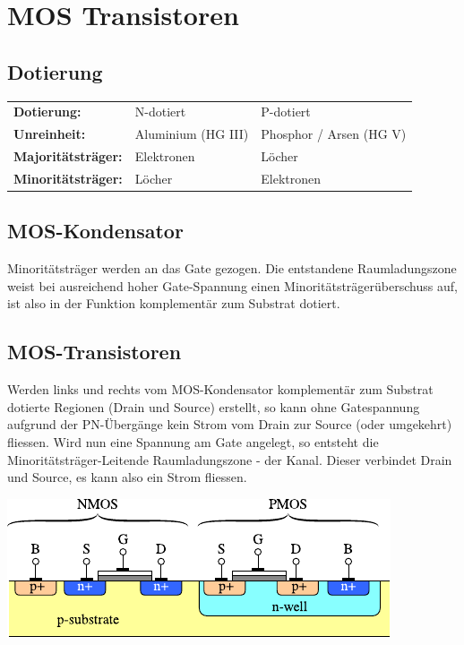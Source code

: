\section{MOS Transistoren}

\subsection{Dotierung}
\begin{center}
    \begin{tabular}{lll}
        \textbf{Dotierung:}          & N-dotiert            & P-dotiert \\
        \textbf{Unreinheit:}         & Aluminium (HG III)   & Phosphor / Arsen (HG V) \\
        \textbf{Majoritätsträger:}   & Elektronen           & Löcher \\
        \textbf{Minoritätsträger:}   & Löcher               & Elektronen \\
    \end{tabular}
\end{center}

\subsection{MOS-Kondensator}
\begin{minipage}{0.5\columnwidth}
    Minoritätsträger werden an das Gate gezogen.
    Die entstandene Raumladungszone weist bei ausreichend hoher Gate-Spannung einen Minoritätsträgerüberschuss auf, ist also in der Funktion komplementär zum Substrat dotiert.
\end{minipage}
\hfill
\begin{minipage}{0.4\columnwidth}
\end{minipage}

\subsection{MOS-Transistoren}
Werden links und rechts vom MOS-Kondensator komplementär zum Substrat dotierte Regionen (Drain und Source) erstellt, so kann ohne Gatespannung aufgrund der PN-Übergänge kein Strom vom Drain zur Source (oder umgekehrt) fliessen.
Wird nun eine Spannung am Gate angelegt, so entsteht die Minoritätsträger-Leitende Raumladungszone - der Kanal.
Dieser verbindet Drain und Source, es kann also ein Strom fliessen.

\begin{center}
    \includegraphics[width=0.5\columnwidth, align=t]{images/01_CMOS.pdf}
\end{center}

